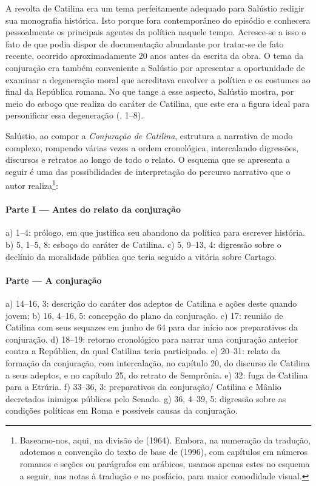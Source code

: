 A revolta de Catilina era um tema perfeitamente adequado para Salústio redigir
sua monografia histórica. Isto porque fora contemporâneo do episódio e
conhecera pessoalmente os principais agentes da política naquele tempo.
Acresce-se a isso o fato de que podia dispor de documentação abundante por
tratar-se de fato recente, ocorrido aproximadamente 20 anos antes da escrita da
obra. O tema da conjuração era também conveniente a Salústio por apresentar a
oportunidade de examinar a degeneração moral que acreditava envolver a política
e os costumes ao final da República romana. No que tange a esse aspecto,
Salústio mostra, por meio do esboço que realiza do caráter de Catilina, que
este era a figura ideal para personificar essa degeneração (, 1--8).

Salústio, ao compor a \emph{Conjuração de Catilina}, estrutura a narrativa de modo
complexo, rompendo várias vezes a ordem cronológica, intercalando digressões,
discursos e retratos ao longo de todo o relato. O esquema que se apresenta a
seguir é uma das possibilidades de interpretação do percurso narrativo que o
autor realiza\footnote{Baseamo-nos, aqui, na divisão de  (1964). Embora, na numeração da tradução, adotemos a convenção do texto de base de  (1996), com capítulos em números romanos e seções ou parágrafos em arábicos, usamos apenas estes no esquema a seguir, nas notas à tradução e no posfácio, para maior comodidade visual.}:  

\paragraph{Parte I --- Antes do relato da conjuração}

a)	1--4: prólogo, em que justifica seu abandono da política para escrever
história.  b)	5, 1--5, 8: esboço do caráter de Catilina.  c)	5, 9--13, 4:
digressão sobre o declínio da moralidade pública que teria seguido a vitória
sobre Cartago. 

\paragraph{Parte  --- A conjuração}

a)	14--16, 3: descrição do caráter dos adeptos de Catilina e ações deste
quando jovem; b)	16, 4--16, 5: concepção do plano da conjuração.  c) 	17:
reunião de Catilina com seus sequazes em junho de 64 para dar início aos preparativos 
da conjuração.  d)	18--19: retorno cronológico para narrar uma conjuração
anterior contra a República, da qual Catilina teria participado.  e)	20--31:
relato da formação da conjuração, com intercalação, no capítulo 20, do discurso
de Catilina a seus adeptos, e no capítulo 25, do retrato de Semprônia.  e)
32:  fuga de Catilina para a Etrúria.  f)	33--36, 3: preparativos da
conjuração/ Catilina e Mânlio decretados inimigos públicos pelo Senado.  g)
36, 4--39, 5: digressão sobre as condições políticas em Roma e possíveis causas
da conjuração.	 	

